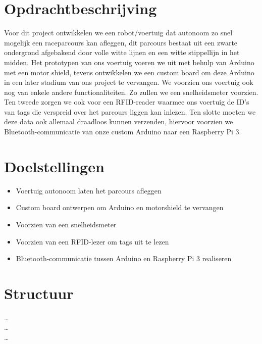 \section{Opdrachtbeschrijving}
Voor dit project ontwikkelen we een robot/voertuig dat autonoom zo snel mogelijk een raceparcours kan afleggen, dit parcours bestaat uit een zwarte ondergrond afgebakend door volle witte lijnen en een witte stippellijn in het midden. Het prototypen van ons voertuig voeren we uit met behulp van Arduino met een motor shield, tevens ontwikkelen we een custom board om deze Arduino in een later stadium van ons project te vervangen. We voorzien ons voertuig ook nog van enkele andere functionaliteiten. Zo zullen we een snelheidsmeter voorzien. Ten tweede zorgen we ook voor een RFID-reader waarmee ons voertuig de ID's van tags die verspreid over het parcours liggen kan inlezen. Ten slotte moeten we deze data ook allemaal draadloos kunnen verzenden, hiervoor voorzien we Bluetooth-communicatie van onze custom Arduino naar een Raspberry Pi 3.
\section{Doelstellingen}
\begin{itemize}
	\item Voertuig autonoom laten het parcours afleggen
	\item Custom board ontwerpen om Arduino en motorshield te vervangen
	\item Voorzien van een snelheidsmeter
	\item Voorzien van een RFID-lezer om tags uit te lezen
	\item Bluetooth-communicatie tussen Arduino en Raspberry Pi 3 realiseren
\end{itemize}
\section{Structuur}
\ldots\\
\ldots\\
\ldots